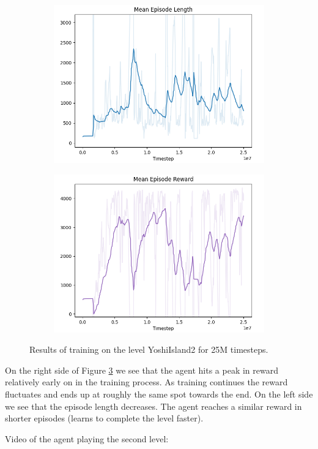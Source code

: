 \documentclass[a4paper]{article}
\begin{document}
\begin{figure}[htbp]
    \centering
    \begin{subfigure}{.45\textwidth}
        \centering
        \includegraphics[width=\textwidth]{PPO_YoshiIsland2_len}
        \label{fig:result2:sub1}
    \end{subfigure}%
    \begin{subfigure}{.45\textwidth}
        \centering
        \includegraphics[width=\textwidth]{PPO_YoshiIsland2_rew}
        \label{fig:result2:sub2}
    \end{subfigure}
    \caption{Results of training on the level YoshiIsland2 for 25M timesteps.}
    \label{fig:result2}
\end{figure}

On the right side of Figure \ref{fig:result2} we see that the agent hits a peak in reward relatively early on in the training process.
As training continues the reward fluctuates and ends up at roughly the same spot towards the end.
On the left side we see that the episode length decreases.
The agent reaches a similar reward in shorter episodes (learns to complete the level faster).

\bigbreak \noindent Video of the agent playing the second level: \href{https://user-images.githubusercontent.com/17729237/187476212-73ea3e18-d42b-4225-8ae2-7bb87132dab3.mp4}{\color{blue}{Yoshi's Island 2}}

\printbibliography
\end{document}
